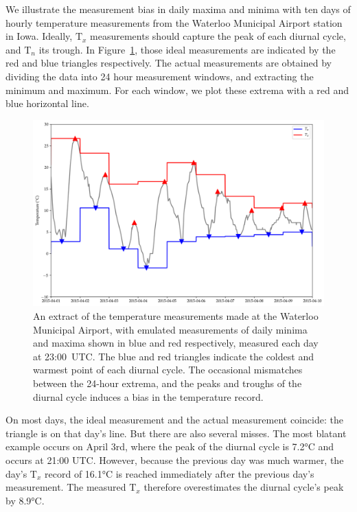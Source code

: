 \documentclass[letter]{article}
\makeatletter
\def\maxwidth{\ifdim\Gin@nat@width>\linewidth\linewidth
\else\Gin@nat@width\fi}
\let\Oldincludegraphics\includegraphics
\renewcommand{\includegraphics}[1]{\Oldincludegraphics[width=0.98\maxwidth]{#1}}
\newcommand{\T}{\mathrm{T}}
\newcommand{\Tn}{\T_{n}}
\newcommand{\Tx}{\T_{x}}
\makeatother
\begin{document}
\label{sec:illustrate_bias}
        We illustrate the measurement bias in daily maxima and minima with ten days of hourly temperature measurements from the Waterloo Municipal Airport station in Iowa.
Ideally, \(\Tx\) measurements should capture the peak of each diurnal cycle, and \(\Tn\) its trough.
In Figure~\ref{fig:waterloo_triangles}, those ideal measurements are indicated by the red and blue triangles respectively.
The actual measurements are obtained by dividing the data into 24 hour measurement windows, and extracting the minimum and maximum.
For each window, we plot these extrema with a red and blue horizontal line.

\begin{figure}
\centering
\includegraphics{../figures/waterloo_triangles.png}
\caption{\label{fig:waterloo_triangles}
An extract of the temperature measurements made at the Waterloo Municipal Airport,
with emulated measurements of daily minima and maxima shown in blue and red respectively,
measured each day at 23:00~UTC.
The blue and red triangles indicate the coldest and warmest point of each diurnal cycle.
The occasional mismatches between the 24-hour extrema, and the peaks and troughs of the diurnal cycle induces a bias in the temperature record.}
\end{figure}

On most days, the ideal measurement and the actual measurement coincide: the triangle is on that day's line.
But there are also several misses. The most blatant example occurs on April 3rd,
where the peak of the diurnal cycle is 7.2°C and occurs at 21:00 UTC.
However, because the previous day was much warmer, the day's \(\Tx\) record of 16.1°C is reached immediately after the previous day's measurement.
The measured \(\Tx\) therefore overestimates the diurnal cycle's peak by 8.9°C.
    
\end{document}
